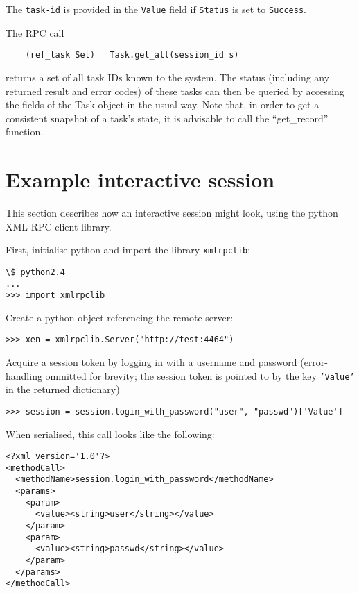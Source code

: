 The {\tt task-id} is provided in the {\tt Value} field if {\tt Status} is set to
{\tt Success}.

The RPC call
\begin{verbatim}
    (ref_task Set)   Task.get_all(session_id s)
\end{verbatim} 
returns a set of all task IDs known to the system. The status (including any
returned result and error codes) of these tasks
can then be queried by accessing the fields of the Task object in the usual way. 
Note that, in order to get a consistent snapshot of a task's state, it is advisable to call the ``get\_record'' function.

\section{Example interactive session}

This section describes how an interactive session might look, using the python
XML-RPC client library. 

First, initialise python and import the library {\tt xmlrpclib}:

\begin{verbatim}
\$ python2.4
...
>>> import xmlrpclib
\end{verbatim}

Create a python object referencing the remote server:

\begin{verbatim}
>>> xen = xmlrpclib.Server("http://test:4464")
\end{verbatim}

Acquire a session token by logging in with a username and password
(error-handling ommitted for brevity; the session token is pointed to by the
key {\tt 'Value'} in the returned dictionary)

\begin{verbatim}
>>> session = session.login_with_password("user", "passwd")['Value']
\end{verbatim}

When serialised, this call looks like the following:

\begin{verbatim}
<?xml version='1.0'?>
<methodCall>
  <methodName>session.login_with_password</methodName>
  <params>
    <param>
      <value><string>user</string></value>
    </param>
    <param>
      <value><string>passwd</string></value>
    </param>
  </params>
</methodCall>
\end{verbatim}

